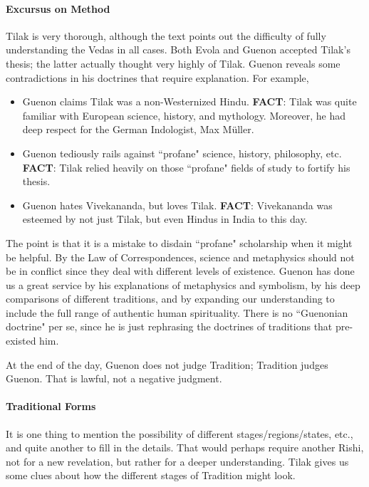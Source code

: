 \paragraph{Excursus on Method}
Tilak is very thorough, although the text points out the difficulty of fully understanding the Vedas in all cases. Both Evola and Guenon accepted Tilak's thesis; the latter actually thought very highly of Tilak. Guenon reveals some contradictions in his doctrines that require explanation. For example,

\begin{itemize}
\item Guenon claims Tilak was a non-Westernized Hindu. \textbf{FACT}: Tilak was quite familiar with European science, history, and mythology. Moreover, he had deep respect for the German Indologist, Max Müller. 
\item Guenon tediously rails against ``profane" science, history, philosophy, etc. \textbf{FACT}: Tilak relied heavily on those ``profane" fields of study to fortify his thesis. 
\item Guenon hates Vivekananda, but loves Tilak. \textbf{FACT}: Vivekananda was esteemed by not just Tilak, but even Hindus in India to this day. 
\end{itemize}
The point is that it is a mistake to disdain ``profane" scholarship when it might be helpful. By the Law of Correspondences, science and metaphysics should not be in conflict since they deal with different levels of existence. Guenon has done us a great service by his explanations of metaphysics and symbolism, by his deep comparisons of different traditions, and by expanding our understanding to include the full range of authentic human spirituality. There is no ``Guenonian doctrine" per se, since he is just rephrasing the doctrines of traditions that pre-existed him.

At the end of the day, Guenon does not judge Tradition; Tradition judges Guenon. That is lawful, not a negative judgment.

\paragraph{Traditional Forms}
It is one thing to mention the possibility of different stages/regions/states, etc., and quite another to fill in the details. That would perhaps require another Rishi, not for a new revelation, but rather for a deeper understanding. Tilak gives us some clues about how the different stages of Tradition might look.

